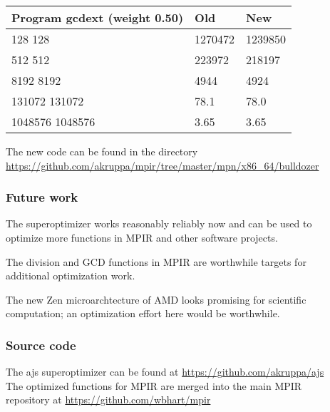 \begin{longtable}[c]{@{}lll@{}}
\toprule
Program gcdext (weight 0.50) & Old & New\tabularnewline
\midrule
\endhead
128 128 & 1270472 & 1239850\tabularnewline
512 512 & 223972 & 218197\tabularnewline
8192 8192 & 4944 & 4924\tabularnewline
131072 131072 & 78.1 & 78.0\tabularnewline
1048576 1048576 & 3.65 & 3.65\tabularnewline
\bottomrule
\end{longtable}

The new code can be found in the directory\\
\url{https://github.com/akruppa/mpir/tree/master/mpn/x86_64/bulldozer}

\subsubsection{Future work}\label{future-work}

The superoptimizer works reasonably reliably now and can be used to\\
optimize more functions in MPIR and other software projects.

The division and GCD functions in MPIR are worthwhile targets for\\
additional optimization work.

The new Zen microarchtecture of AMD looks promising for scientific\\
computation; an optimization effort here would be worthwhile.

\subsubsection{Source code}\label{source-code}

The ajs superoptimizer can be found at
\url{https://github.com/akruppa/ajs}\\
The optimized functions for MPIR are merged into the main MPIR\\
repository at \url{https://github.com/wbhart/mpir}

